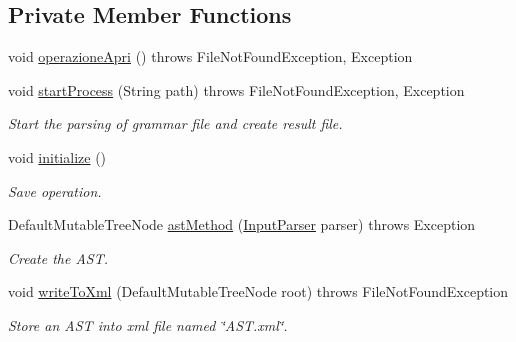 \subsection*{Private Member Functions}
\begin{DoxyCompactItemize}
\item 
void \hyperlink{class_home_gui_a8a91bfb188035012962b468a651f73a5}{operazione\-Apri} ()  throws File\-Not\-Found\-Exception, Exception 
\item 
void \hyperlink{class_home_gui_a52f0602a97cd1ef63063bbbbda036d26}{start\-Process} (String path)  throws File\-Not\-Found\-Exception, Exception 
\begin{DoxyCompactList}\small\item\em Start the parsing of grammar file and create result file. \end{DoxyCompactList}\item 
void \hyperlink{class_home_gui_a5e935834d62fe14dfda2c9884f1f7010}{initialize} ()
\begin{DoxyCompactList}\small\item\em Save operation. \end{DoxyCompactList}\item 
Default\-Mutable\-Tree\-Node \hyperlink{class_home_gui_a98af3aa80619748a678edae77b231bef}{ast\-Method} (\hyperlink{classinput_parser_1_1_input_parser}{Input\-Parser} parser)  throws Exception 
\begin{DoxyCompactList}\small\item\em Create the A\-S\-T. \end{DoxyCompactList}\item 
void \hyperlink{class_home_gui_a0428d3c56abfafc769684835c1581f38}{write\-To\-Xml} (Default\-Mutable\-Tree\-Node root)  throws File\-Not\-Found\-Exception 
\begin{DoxyCompactList}\small\item\em Store an A\-S\-T into xml file named \char`\"{}\-A\-S\-T.\-xml\char`\"{}. \end{DoxyCompactList}\end{DoxyCompactItemize}
